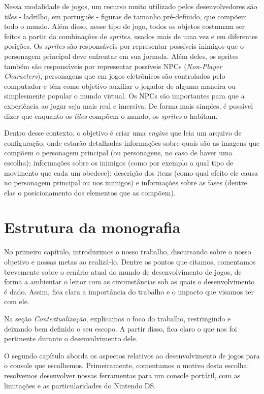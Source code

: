 \documentclass[brazil]{abnt}
\begin{document}
Nessa modalidade de jogos, um recurso muito utilizado pelos desenvolvedores são \textit{tiles} - ladrilho, em português - figuras de tamanho pré-definido, que compõem todo o mundo. Além disso, nesse tipo de jogo, todos os objetos costumam ser feitos a partir da combinações de \textit{sprites}, usados mais de uma vez e em diferentes posições. Os \textit{sprites} são responsáveis por representar possíveis inimigos que o personagem principal deve enfrentar em sua jornada. Além deles, os sprites também são responsáveis por representar possíveis NPCs (\textit{Non-Player Characters}), personagens que em jogos eletrônicos são controlados pelo computador e têm como objetivo auxiliar o jogador de alguma maneira ou simplesmente popular o mundo virtual. Os NPCs são importantes para que a experiência ao jogar seja mais real e imersiva. De forma mais simples, é possível dizer que enquanto os \textit{tiles} compõem o mundo, os \textit{sprites} o habitam.

Dentro desse contexto, o objetivo é criar uma \textit{engine} que leia um arquivo de configuração, onde estarão detalhadas informações sobre quais são as imagens que compõem o personagem principal (ou personagens, no caso de haver uma escolha); informações sobre os inimigos (como por exemplo a qual tipo de movimento que cada um obedece); descrição dos itens (como qual efeito ele causa no personagem principal ou nos inimigos) e informações sobre as fases (dentre elas o posicionamento dos elementos que as compõem).

\section{Estrutura da monografia}

No primeiro capítulo, introduzimos o nosso trabalho, discursando sobre o nosso objetivo e nossas metas ao realizá-lo. Dentre os pontos que citamos, comentamos brevemente sobre o cenário atual do mundo de desenvolvimento de jogos, de forma a ambientar o leitor com as circunstâncias sob as quais o desenvolvimento é dado. Assim, fica clara a importância do trabalho e o impacto que visamos ter com ele.

Na seção \textit{Contextualização}, explicamos o foco do trabalho, restringindo e deixando bem definido o seu escopo. A partir disso, fica claro o que nos foi pertinente durante o desenvolvimento dele.

O segundo capítulo aborda os aspectos relativos ao desenvolvimento de jogos para o console que escolhemos. Primeiramente, comentamos o motivo desta escolha: resolvemos desenvolver nossas ferramentas para um console portátil, com as limitações e as particularidades do Nintendo DS.
\end{document}
